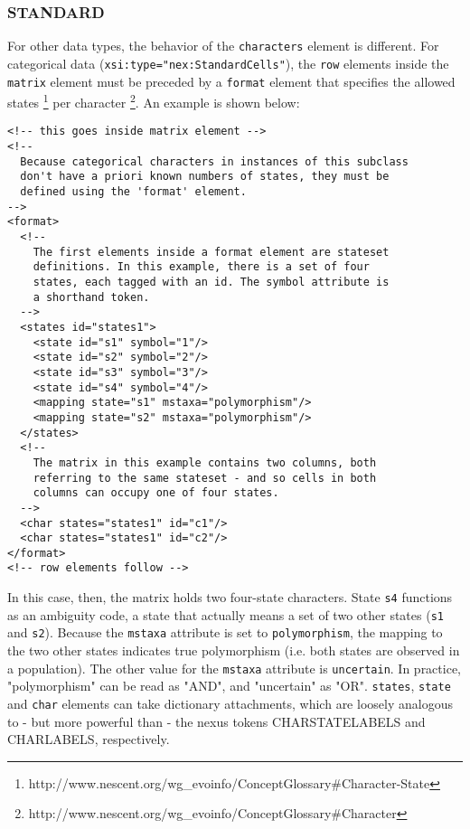 \documentclass{article}
\newcommand{\code}{\texttt}
\begin{document}
\subsubsection{STANDARD}
For other data types, the behavior of the \code{characters} element is different. For categorical data 
(\code{xsi:type="nex:StandardCells"}), the \code{row} elements inside the \code{matrix} element must be preceded 
by a \code{format} element that specifies the allowed states 
\footnote{http://www.nescent.org/wg\_evoinfo/ConceptGlossary\#Character-State} per character 
\footnote{http://www.nescent.org/wg\_evoinfo/ConceptGlossary\#Character}. An example is shown below:
\begin{verbatim}
<!-- this goes inside matrix element -->
<!--
  Because categorical characters in instances of this subclass
  don't have a priori known numbers of states, they must be
  defined using the 'format' element. 
-->
<format>
  <!--
    The first elements inside a format element are stateset
    definitions. In this example, there is a set of four
    states, each tagged with an id. The symbol attribute is
    a shorthand token. 
  -->
  <states id="states1">
    <state id="s1" symbol="1"/>                
    <state id="s2" symbol="2"/>                
    <state id="s3" symbol="3"/>                
    <state id="s4" symbol="4"/>  
    <mapping state="s1" mstaxa="polymorphism"/>
    <mapping state="s2" mstaxa="polymorphism"/>              
  </states>
  <!--
    The matrix in this example contains two columns, both
    referring to the same stateset - and so cells in both
    columns can occupy one of four states. 
  -->
  <char states="states1" id="c1"/>
  <char states="states1" id="c2"/>
</format>
<!-- row elements follow -->
\end{verbatim}

In this case, then, the matrix holds two four-state characters. State \code{s4} functions as an ambiguity code, a state that 
actually means a set of two other states (\code{s1} and \code{s2}). Because the \code{mstaxa} attribute is set to 
\code{polymorphism}, the mapping to the two other states indicates true polymorphism (i.e. both states are observed in a population). The other value for the \code{mstaxa} attribute is \code{uncertain}. In practice, "polymorphism" can be read as "AND", and "uncertain" as "OR". \code{states}, \code{state} and \code{char}  elements can take dictionary attachments, which are loosely analogous to - but more powerful than - the nexus tokens CHARSTATELABELS and CHARLABELS, respectively.
\end{document}
